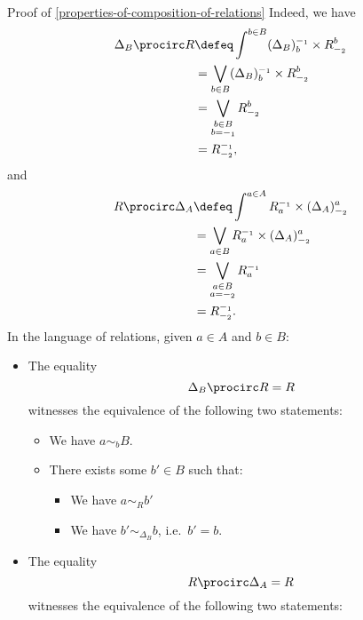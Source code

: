 \begin{Proof}{Proof of \cref{properties-of-composition-of-relations}}
    Indeed, we have
    \begin{align*}
        \Delta_{B}\procirc R &\defeq \int^{b\in B}(\Delta_{B})^{-_{1}}_{b}\times R^{b}_{-_{2}}\\
                             &=      \bigvee_{b\in B}(\Delta_{B})^{-_{1}}_{b}\times R^{b}_{-_{2}}\\
                             &=      \bigvee_{\substack{b\in B\\b=-_{1}}}R^{b}_{-_{2}}\\
                             &=      R^{-_{1}}_{-_{2}},
    \end{align*}
    and
    \begin{align*}
        R\procirc\Delta_{A} &\defeq \int^{a\in A}R^{-_{1}}_{a}\times(\Delta_{A})^{a}_{-_{2}}\\
                            &=      \bigvee_{a\in B}R^{-_{1}}_{a}\times(\Delta_{A})^{a}_{-_{2}}\\
                            &=      \bigvee_{\substack{a\in B\\a=-_{2}}}R^{-_{1}}_{a}\\
                            &=      R^{-_{1}}_{-_{2}}.
    \end{align*}
    In the language of relations, given $a\in A$ and $b\in B$:
    \begin{itemize}
        \item The equality
            \[
                \Delta_{B}\procirc R%
                =%
                R%
            \]%
            witnesses the equivalence of the following two statements:
            \begin{itemize}
                \item We have $a\sim_{b}B$.
                \item There exists some $b'\in B$ such that:
                    \begin{itemize}
                        \item We have $a\sim_{R}b'$
                        \item We have $b'\sim_{\Delta_{B}}b$, i.e.\ $b'=b$.
                    \end{itemize}
            \end{itemize}
        \item The equality
            \[
                R\procirc\Delta_{A}%
                =%
                R%
            \]%
            witnesses the equivalence of the following two statements:

\end{itemize}
\end{Proof}
